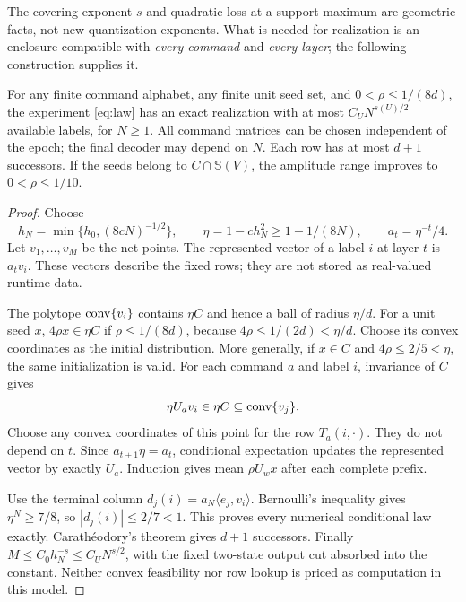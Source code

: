 The covering exponent $s$ and quadratic loss at a support maximum
are geometric facts, not new quantization exponents. What is needed
for realization is an enclosure compatible with \emph{every command}
and \emph{every layer}; the following construction supplies it.

\begin{theorem}
\label{thm:orbit-upper}
For any finite command alphabet, any finite unit seed set, and
$0<\rho\le1/(8d)$, the experiment \eqref{eq:law} has an exact
realization with at most $C_U N^{s(U)/2}$ available labels, for
$N\ge1$. All command matrices can be chosen independent of the epoch;
the final decoder may depend on $N$. Each row has at most $d+1$
successors. If the seeds belong to $C\cap\mathbb S(V)$, the amplitude
range improves to $0<\rho\le1/10$.
\end{theorem}
\begin{proof}
Choose
\[
 h_N=\min\{h_0,(8cN)^{-1/2}\},\qquad
 \eta=1-ch_N^2\ge1-1/(8N),\qquad a_t=\eta^{-t}/4.
\]
Let $v_1,\ldots,v_M$ be the net points. The represented vector of a
label $i$ at layer $t$ is $a_tv_i$. These vectors describe the fixed
rows; they are not stored as real-valued runtime data.

The polytope $\operatorname{conv}\{v_i\}$ contains $\eta C$ and hence a ball
of radius $\eta/d$. For a unit seed $x$,
$4\rho x\in\eta C$ if $\rho\le1/(8d)$, because
$4\rho\le1/(2d)<\eta/d$. Choose its convex coordinates as the
initial distribution. More generally, if $x\in C$ and
$4\rho\le2/5<\eta$, the same initialization is valid.
For each command $a$ and label $i$, invariance of $C$ gives
\[
       \eta U_av_i\in\eta C\subseteq\operatorname{conv}\{v_j\}.
\]
Choose any convex coordinates of this point for the row $T_a(i,\cdot)$.
They do not depend on $t$. Since $a_{t+1}\eta=a_t$, conditional
expectation updates the represented vector by exactly $U_a$.
Induction gives mean $\rho U_wx$ after each complete prefix.

Use the terminal column $d_j(i)=a_N\langle e_j,v_i\rangle$.
Bernoulli's inequality gives $\eta^N\ge7/8$, so
$|d_j(i)|\le2/7<1$. This proves every numerical conditional law
exactly. Carath\'eodory's theorem gives $d+1$ successors. Finally
$M\le C_0h_N^{-s}\le C_UN^{s/2}$, with the fixed two-state output
cut absorbed into the constant. Neither convex feasibility nor row
lookup is priced as computation in this model.
\end{proof}

